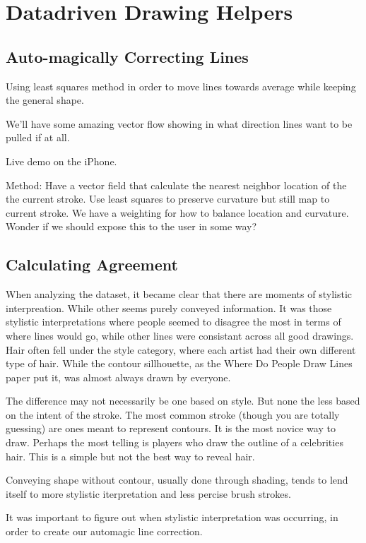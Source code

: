 \section{Datadriven Drawing Helpers}

\subsection{Auto-magically Correcting Lines}
Using least squares method in order to move lines towards average while keeping the general shape.

We'll have some amazing vector flow showing in what direction lines want to be pulled if at all.

Live demo on the iPhone.

Method:
Have a vector field that calculate the nearest neighbor location of the the current stroke.
Use least squares to preserve curvature but still map to current stroke.
We have a weighting for how to balance location and curvature. Wonder if we should expose this to the user in some way?

\subsection{Calculating Agreement}
When analyzing the dataset, it became clear that there are moments of stylistic interpreation. While other seems purely conveyed information. It was those stylistic interpretations where people seemed to disagree the most in terms of where lines would go, while other lines were consistant across all good drawings. Hair often fell under the style category, where each artist had their own different type of hair. While the contour sillhouette, as the Where Do People Draw Lines paper put it, was almost always drawn by everyone. 

The difference may not necessarily be one based on style. But none the less based on the intent of the stroke. The most common stroke (though you are totally guessing) are ones meant to represent contours. It is the most novice way to draw. Perhaps the most telling is players who draw the outline of a celebrities hair. This is a simple but not the best way to reveal hair. 

Conveying shape without contour, usually done through shading, tends to lend itself to more stylistic iterpretation and less percise brush strokes. 

It was important to figure out when stylistic interpretation was occurring, in order to create our automagic line correction. 

